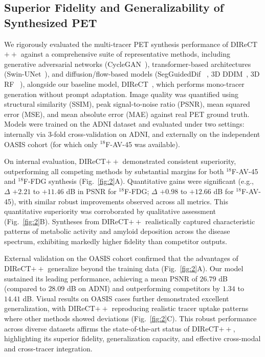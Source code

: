 \documentclass{article}
\begin{document}
\subsection{Superior Fidelity and Generalizability of Synthesized PET}
We rigorously evaluated the multi-tracer PET synthesis performance of DIReCT$++$ against a comprehensive suite of representative methods, including generative adversarial networks (CycleGAN~\cite{zhu2017unpaired}), transformer-based architectures (Swin-UNet~\cite{Cao2021swin}), and diffusion/flow-based models (SegGuidedDif ~\cite{konz2024anatomically}, 3D DDIM~\cite{Graf2023}, 3D RF ~\cite{Xing2022}), alongside our baseline model, DIReCT~\cite{liu2025direct}, which performs mono-tracer generation without prompt adaptation. Image quality was quantified using structural similarity (SSIM), peak signal-to-noise ratio (PSNR), mean squared error (MSE), and mean absolute error (MAE) against real PET ground truth. 
Models were trained on the ADNI dataset and evaluated under two settings: internally via 3-fold cross-validation on ADNI, and externally on the independent OASIS cohort (for which only $^{18}$F-AV-45 was available).

On internal evaluation, DIReCT$++$ demonstrated consistent superiority, outperforming all competing methods by substantial margins for both $^{18}$F-AV-45 and $^{18}$F-FDG synthesis (Fig.~\ref{fig:2}A). Quantitative gains were significant (e.g., $\Delta$ $+2.21$ to $+11.46$ dB in PSNR for $^{18}$F-FDG; $\Delta$ $+0.98$  to $+12.66$ dB for $^{18}$F-AV-45), with similar robust improvements observed across all metrics. This quantitative superiority was corroborated by qualitative assessment (Fig.~\ref{fig:2}B). Syntheses from DIReCT$++$ realistically captured characteristic patterns of metabolic activity and amyloid deposition across the disease spectrum, exhibiting markedly higher fidelity than competitor outputs.

External validation on the OASIS cohort confirmed that the advantages of DIReCT$++$ generalize beyond the training data (Fig.~\ref{fig:2}A). Our model sustained its leading performance, achieving a mean PSNR of $26.79$ dB (compared to $28.09$ dB on ADNI) and outperforming competitors by $1.34$ to $14.41$ dB. Visual results on OASIS cases further demonstrated excellent generalization, with DIReCT$++$ reproducing realistic tracer uptake patterns where other methods showed deviations (Fig.~\ref{fig:2}C). This robust performance across diverse datasets affirms the state-of-the-art status of DIReCT$++$, highlighting its superior fidelity, generalization capacity, and effective cross-modal and cross-tracer integration.
\end{document}
